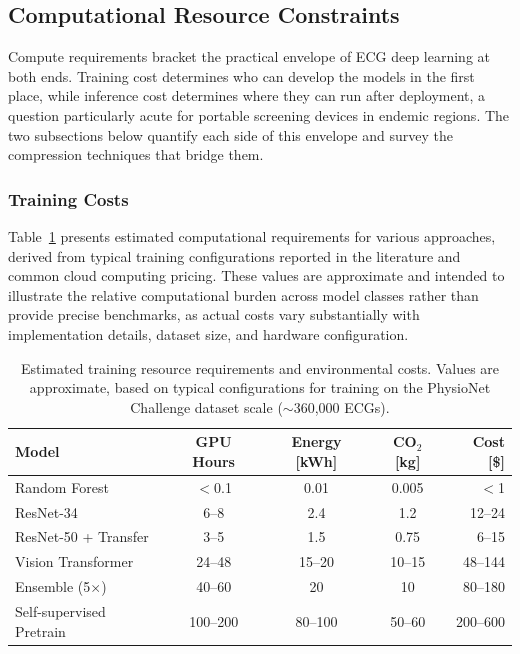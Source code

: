 \subsection{Computational Resource Constraints}

Compute requirements bracket the practical envelope of ECG deep learning at both ends. Training cost determines who can develop the models in the first place, while inference cost determines where they can run after deployment, a question particularly acute for portable screening devices in endemic regions. The two subsections below quantify each side of this envelope and survey the compression techniques that bridge them.

\subsubsection{Training Costs}

Table~\ref{tab:training_costs} presents estimated computational requirements for various approaches, derived from typical training configurations reported in the literature and common cloud computing pricing. These values are approximate and intended to illustrate the relative computational burden across model classes rather than provide precise benchmarks, as actual costs vary substantially with implementation details, dataset size, and hardware configuration.

\begin{table}[h]
\centering
\caption[Estimated training resource requirements and environmental costs]{Estimated training resource requirements and environmental costs. Values are approximate, based on typical configurations for training on the PhysioNet Challenge dataset scale ($\sim$360,000 ECGs).}
\label{tab:training_costs}
\begin{tabular}{lcccr}
\hline
\textbf{Model} & \textbf{GPU Hours} & \textbf{Energy [kWh]} & \textbf{CO$_2$ [kg]} & \textbf{Cost [\$]} \\
\hline
Random Forest & $<$0.1 & 0.01 & 0.005 & $<$1 \\
ResNet-34 & 6--8 & 2.4 & 1.2 & 12--24 \\
ResNet-50 + Transfer & 3--5 & 1.5 & 0.75 & 6--15 \\
Vision Transformer & 24--48 & 15--20 & 10--15 & 48--144 \\
Ensemble (5$\times$) & 40--60 & 20 & 10 & 80--180 \\
Self-supervised Pretrain & 100--200 & 80--100 & 50--60 & 200--600 \\
\hline
\end{tabular}
\end{table}

